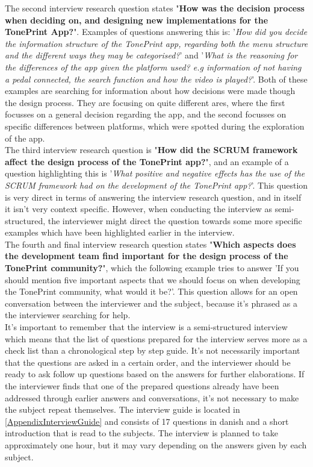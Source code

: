 \noindent
The second interview research question states "\textbf{How was the decision process when deciding on, and designing new implementations for the TonePrint App?}". Examples of questions answering this is: '\textit{How did you decide the information structure of the TonePrint app, regarding both the menu structure and the different ways they may be categorised?}' and '\textit{What is the reasoning for the differences of the app given the platform used? e.g information of not having a pedal connected, the search function and how the video is played?}'. Both of these examples are searching for information about how decisions were made though the design process. They are focusing on quite different ares, where the first focusses on a general decision regarding the app, and the second focusses on specific differences between platforms, which were spotted during the exploration of the app. \\

\noindent
The third interview research question is "\textbf{How did the SCRUM framework affect the design process of the TonePrint app?}", and an example of a question highlighting this is '\textit{What positive and negative effects has the use of the SCRUM framework had on the development of the TonePrint app?}'. This question is very direct in terms of answering the interview research question, and in itself it isn't very context specific. However, when conducting the interview as semi-structured, the interviewer might direct the question towards some more specific examples which have been highlighted earlier in the interview.\\

\noindent
The fourth and final interview research question states "\textbf{Which aspects does the development team find important for the design process of the TonePrint community?}", which the following example tries to answer 'If you should mention five important aspects that we should focus on when developing the TonePrint community, what would it be?'. This question allows for an open conversation between the interviewer and the subject, because it's phrased as a the interviewer searching for help.\\

\noindent
It's important to remember that the interview is a semi-structured interview which means that the list of questions prepared for the interview serves more as a check list than a chronological step by step guide. It's not necessarily important that the questions are asked in a certain order, and the interviewer should be ready to ask follow up questions based on the answers for further elaborations. If the interviewer finds that one of the prepared questions already have been addressed through earlier answers and conversations, it's not necessary to make the subject repeat themselves. The interview guide is located in \autoref{AppendixInterviewGuide} and consists of 17 questions in danish and a short introduction that is read to the subjects. The interview is planned to take approximately one hour, but it may vary depending on the answers given by each subject.

